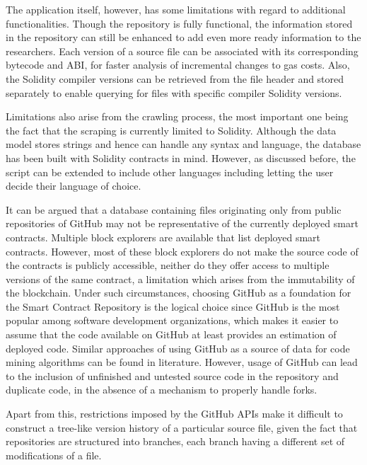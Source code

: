 \documentclass[10pt,conference]{IEEEtran}
\begin{document}
	The application itself, however, has some limitations with regard to additional functionalities. Though the repository is fully functional, the information stored in the repository can still be enhanced to add even more ready information to the researchers. Each version of a source file can be associated with its corresponding bytecode and ABI, for faster analysis of incremental changes to gas costs. Also, the Solidity compiler versions can be retrieved from the file header and stored separately to enable querying for files with specific compiler Solidity versions.
	
	Limitations also arise from the crawling process, the most important one being the fact that the scraping is currently limited to Solidity. Although the data model stores strings and hence can handle any syntax and language, the database has been built with Solidity contracts in mind. However, as discussed before, the script can be extended to include other languages including letting the user decide their language of choice.
	
	It can be argued that a database containing files originating only from public repositories of GitHub may not be representative of the currently deployed smart contracts. Multiple block explorers are available that list deployed smart contracts. However, most of these block explorers do not make the source code of the contracts is publicly accessible, neither do they offer access to multiple versions of the same contract, a limitation which arises from the immutability of the blockchain. Under such circumstances, choosing GitHub as a foundation for the Smart Contract Repository is the logical choice since GitHub is the most popular among software development organizations, which makes it easier to assume that the code available on GitHub at least provides an estimation of deployed code. Similar approaches of using GitHub as a source of data for code mining algorithms can be found in literature\cite{schroder, dabic, yang}. However, usage of GitHub can lead to the inclusion of unfinished and untested source code in the repository and duplicate code, in the absence of a mechanism to properly handle forks. 
	
	Apart from this, restrictions imposed by the GitHub APIs make it difficult to construct a tree-like version history of a particular source file, given the fact that repositories are structured into branches, each branch having a different set of modifications of a file. 
	
\end{document}
